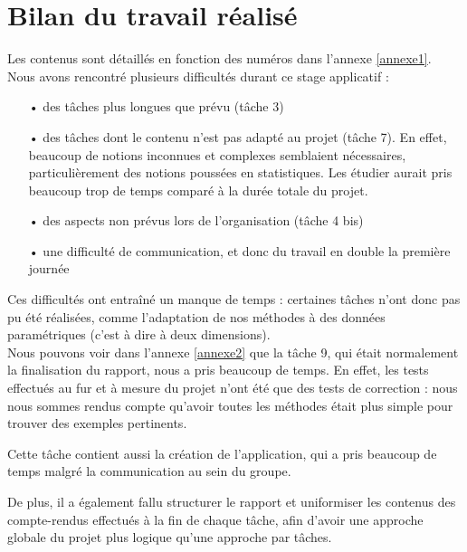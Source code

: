 \documentclass[a4paper,12pt]{article} %
\begin{document}
	\section{Bilan du travail réalisé}
    Les contenus sont détaillés en fonction des numéros dans l'annexe \ref{annexe1}. Nous avons rencontré plusieurs difficultés durant ce stage applicatif :
    \begin{itemize}
        \item [•] des tâches plus longues que prévu (tâche 3)
        \item [•]  des tâches dont le contenu n'est pas adapté au projet (tâche 7). En effet, beaucoup de notions inconnues et complexes semblaient nécessaires, particulièrement des notions poussées en statistiques. Les étudier aurait pris beaucoup trop de temps comparé à la durée totale du projet.
        \item [•]  des aspects non prévus lors de l'organisation (tâche 4 bis)
        \item [•]  une difficulté de communication, et donc du travail en double la première journée
    \end{itemize}
    
    
    Ces difficultés ont entraîné un manque de temps : certaines tâches n'ont donc pas pu été réalisées, comme l'adaptation de nos méthodes à des données paramétriques (c'est à dire à deux dimensions).\\
    
    Nous pouvons voir dans l'annexe \ref{annexe2} que la tâche 9, qui était normalement la finalisation du rapport, nous a pris beaucoup de temps. En effet, les tests effectués au fur et à mesure du projet n'ont été que des tests de correction : nous nous sommes rendus compte qu'avoir toutes les méthodes était plus simple pour trouver des exemples pertinents.
    
    Cette tâche contient aussi la création de l'application, qui a pris beaucoup de temps malgré la communication au sein du groupe.
    
    De plus, il a également fallu structurer le rapport et uniformiser les contenus des compte-rendus effectués à la fin de chaque tâche, afin d'avoir une approche globale du projet plus logique qu'une approche par tâches.\\
    
\end{document}
